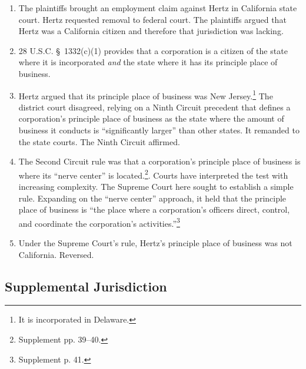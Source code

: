 \begin{enumerate}
    \item The plaintiffs brought an employment claim against Hertz in 
    California state court. Hertz requested removal to federal court. The 
    plaintiffs argued that Hertz was a California citizen and therefore that 
    jurisdiction was lacking.
    \item 28 U.S.C. \S\ 1332(c)(1) provides that a corporation is a citizen of 
    the state where it is incorporated \emph{and} the state where it has its 
    principle place of business.
    \item Hertz argued that its principle place of business was New 
    Jersey.\footnote{It is incorporated in Delaware.} The district court 
    disagreed, relying on a Ninth Circuit precedent that defines a 
    corporation's principle place of business as the state where the amount of 
    business it conducts is ``significantly larger'' than other states. It 
    remanded to the state courts. The Ninth Circuit affirmed.
    \item The Second Circuit rule was that a corporation's principle place of 
    business is where its ``nerve center'' is located.\footnote{Supplement pp.  
    39--40.}. Courts have interpreted the test with increasing complexity. The 
    Supreme Court here sought to establish a simple rule. Expanding on the 
    ``nerve center'' approach, it held that the principle place of business is 
    ``the place where a corporation's officers direct, control, and coordinate 
    the corporation's activities.''\footnote{Supplement p. 41.}
    \item Under the Supreme Court's rule, Hertz's principle place of business 
    was not California. Reversed.
\end{enumerate}

\subsection{Supplemental Jurisdiction}

